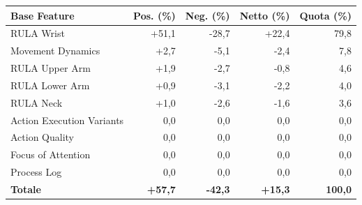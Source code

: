 \begin{tabular*}{\linewidth}{@{}l@{\extracolsep{\fill}}rrrr@{}}
\toprule
\textbf{Base Feature} & \textbf{Pos. (\%)} & \textbf{Neg. (\%)} & \textbf{Netto (\%)} & \textbf{Quota (\%)} \\
\midrule
RULA Wrist & +51{,}1 & -28{,}7 & +22{,}4 & 79{,}8 \\
Movement Dynamics & +2{,}7 & -5{,}1 & -2{,}4 & 7{,}8 \\
RULA Upper Arm & +1{,}9 & -2{,}7 & -0{,}8 & 4{,}6 \\
RULA Lower Arm & +0{,}9 & -3{,}1 & -2{,}2 & 4{,}0 \\
RULA Neck & +1{,}0 & -2{,}6 & -1{,}6 & 3{,}6 \\
Action Execution Variants & 0{,}0 & 0{,}0 & 0{,}0 & 0{,}0 \\
Action Quality & 0{,}0 & 0{,}0 & 0{,}0 & 0{,}0 \\
Focus of Attention & 0{,}0 & 0{,}0 & 0{,}0 & 0{,}0 \\
Process Log & 0{,}0 & 0{,}0 & 0{,}0 & 0{,}0 \\
\midrule
\textbf{Totale} & \textbf{+57{,}7} & \textbf{-42{,}3} & \textbf{+15{,}3} & \textbf{100{,}0} \\
\bottomrule
\end{tabular*}
